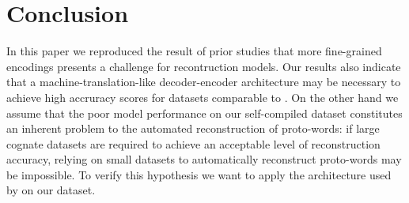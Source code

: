  
\section{Conclusion}
In this paper we reproduced the result of prior studies that more fine-grained encodings presents a challenge for recontruction models. Our results also indicate that a machine-translation-like decoder-encoder architecture may be necessary to achieve high accruracy scores for datasets comparable to \citet{ciobanu-dinu-2014-automatic}. On the other hand we assume that the poor model performance on our self-compiled dataset constitutes an inherent problem to the automated reconstruction of proto-words: 
if large cognate datasets are required to achieve an acceptable level of reconstruction accuracy, relying on small datasets to automatically reconstruct proto-words may be impossible. To verify this hypothesis we want to apply the architecture used by \citet{meloni2019ab} on our dataset.







